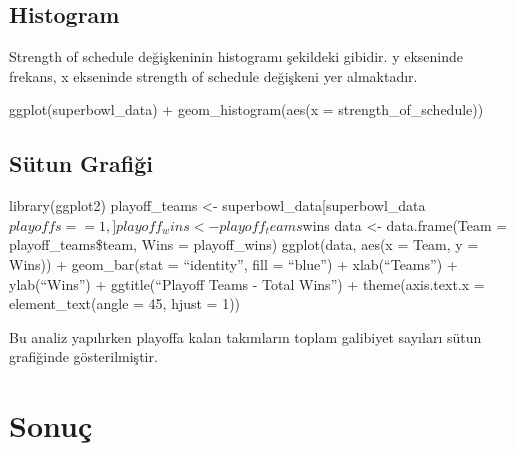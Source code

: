 \documentclass[
  12pt,
]{article}
\begin{document}
\hypertarget{histogram}{%
\subsection{Histogram}\label{histogram}}

Strength of schedule değişkeninin histogramı şekildeki gibidir.
y ekseninde frekans, x ekseninde strength of schedule değişkeni yer almaktadır.

ggplot(superbowl\_data) +
geom\_histogram(aes(x = strength\_of\_schedule))

\hypertarget{suxfctun-grafiux11fi}{%
\subsection{Sütun Grafiği}\label{suxfctun-grafiux11fi}}

library(ggplot2)
playoff\_teams \textless- superbowl\_data{[}superbowl\_data\(playoffs == 1, ] playoff_wins <- playoff_teams\)wins
data \textless- data.frame(Team = playoff\_teams\$team, Wins = playoff\_wins)
ggplot(data, aes(x = Team, y = Wins)) +
geom\_bar(stat = ``identity'', fill = ``blue'') +
xlab(``Teams'') +
ylab(``Wins'') +
ggtitle(``Playoff Teams - Total Wins'') +
theme(axis.text.x = element\_text(angle = 45, hjust = 1))

Bu analiz yapılırken playoffa kalan takımların toplam galibiyet sayıları sütun grafiğinde gösterilmiştir.

\hypertarget{sonuuxe7}{%
\section{Sonuç}\label{sonuuxe7}}
\end{document}
